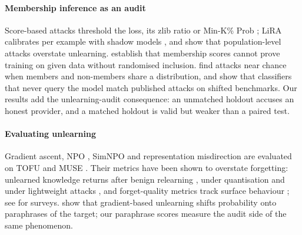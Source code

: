 \paragraph{Membership inference as an audit} Score-based attacks threshold the loss, its zlib
ratio \citep{carlini2021extracting} or Min-K\% Prob \citep{shi2024mink}; LiRA calibrates per
example with shadow models \citep{carlini2022lira}, and \citet{hayes2024inexact} show that
population-level attacks overstate unlearning. \citet{zhang2024mia} establish that
membership scores cannot prove training on given data without randomised inclusion.
\citet{duan2024membership} find attacks near chance when members and non-members share a
distribution, and \citet{das2024blind} show that classifiers that never query the model match
published attacks on shifted benchmarks. Our results add the unlearning-audit consequence:
an unmatched holdout accuses an honest provider, and a matched holdout is valid but weaker
than a paired test.

\paragraph{Evaluating unlearning} Gradient ascent, NPO \citep{zhang2024npo}, SimNPO
\citep{fan2025simnpo} and representation misdirection \citep{li2024wmdp} are evaluated on TOFU
\citep{maini2024tofu} and MUSE \citep{shi2024muse}. Their metrics have been shown to overstate
forgetting: unlearned knowledge returns after benign relearning \citep{hu2025jogging}, under
quantisation \citep{zhang2025quantization} and under lightweight attacks
\citep{lucki2024adversarial}, and forget-quality metrics track surface behaviour
\citep{wang2025towards,yuan2025closer,feng2025existing}; see
\citet{liu2025rethinking,xue2026survey} for surveys. \citet{li2026beliefs} show that
gradient-based unlearning shifts probability onto paraphrases of the target; our paraphrase
scores measure the audit side of the same phenomenon.
